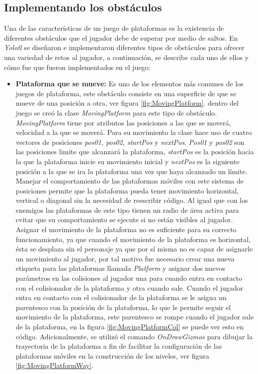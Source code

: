 \subsection{Implementando los obstáculos}
Una de las características de un juego de plataformas es la existencia de diferentes 
obstáculos que el jugador debe de superar por medio de saltos\cite{Ref_JuegoDisenio}. 
En \textit{Yolotl} se diseñaron e implementaron diferentes tipos de obstáculos 
para ofrecer una variedad de retos al jugador, a continuación, se describe cada 
uno de ellos y cómo fue que fueron implementados en el juego:
	\begin{itemize}
		\item \textbf{Plataforma que se mueve:} Es uno de los elementos más comunes de 
		los juegos de plataforma, este   obstáculo consiste en una superficie de que 
		se mueve de una posición a otra, ver figura \ref{fig:MovingPlatform}. dentro 
		del juego se creó la clase \textit{MovingPlatform} para este tipo de obstáculo. 
		\textit{MovingPlatform} tiene por atributos las posiciones a las que se moverá, 
		velocidad a la que se moverá. Para su movimiento la clase hace uso de cuatro 
		vectores de posiciones \textit{pos01, pos02, startPos} y \textit{nextPos}. 
		\textit{Pos01} y \textit{pos02} son las posiciones limite que alcanzará la 
		plataforma, \textit{startPos} es la posición hacia la que la plataforma inicie 
		su movimiento inicial y \textit{nextPos} es la siguiente posición a la que se 
		ira la plataforma una vez que haya alcanzado un límite. Manejar el 
		comportamiento de las plataformas móviles con este sistema de posiciones 
		permite que la plataforma pueda tener movimiento horizontal, vertical o diagonal 
		sin la necesidad de reescribir código. Al igual que con los enemigos las 
		plataformas de este tipo tienen un radio de área activa para evitar que su 
		comportamiento se ejecute si no están visibles al jugador. Asignar el movimiento 
		de la plataforma no es suficiente para su correcto funcionamiento, ya que 
		cuando el movimiento de la plataforma es horizontal, ésta se desplaza sin el 
		personaje ya que por sí misma no es capaz de asignarle un movimiento al jugador, 
		por tal motivo fue necesario crear una nueva etiqueta para las plataformas 
		llamada \textit{Platform} y asignar dos nuevos parámetros en las colisiones 
		al jugador 
		una para cuando entra en contacto con el colisionador de la plataforma y otra 
		cuando sale. Cuando el jugador entra en contacto con el colisionador de la 
		plataforma se le asigna un parentesco con la posición de la plataforma, lo 
		que le permite seguir el movimiento de la plataforma, este parentesco se 
		rompe cuando el jugador sale de la plataforma, en la figura 
		\ref{fig:MovingPlatformCol} se puede ver esto en código. Adicionalmente, 
		se utilizó el comando \textit{OnDrawGizmos} para dibujar la trayectoria de la 
		plataforma a fin de facilitar la configuración de las plataformas móviles en la 
		construcción de los niveles, ver figura \ref{fig:MovingPlatformWay}.
			

\end{itemize}

